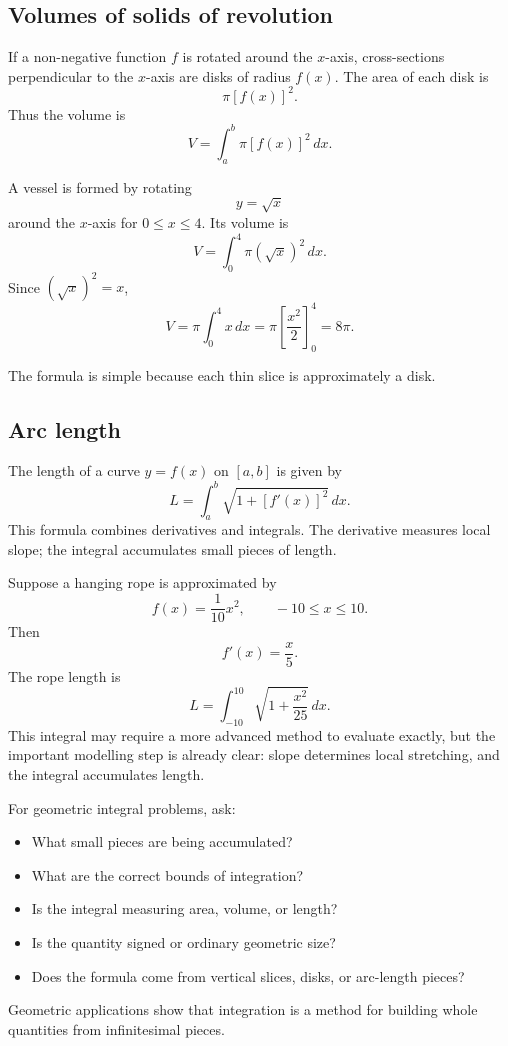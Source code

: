 \subsection*{Volumes of solids of revolution}

If a non-negative function \(f\) is rotated around the \(x\)-axis, cross-sections perpendicular to the \(x\)-axis are disks of radius \(f(x)\). The area of each disk is
\[
\pi[f(x)]^2.
\]
Thus the volume is
\[
V=\int_a^b \pi[f(x)]^2\,dx.
\]

\begin{examplebox}
A vessel is formed by rotating
\[
y=\sqrt{x}
\]
around the \(x\)-axis for \(0\le x\le4\). Its volume is
\[
V=\int_0^4 \pi(\sqrt{x})^2\,dx.
\]
Since \((\sqrt{x})^2=x\),
\[
V=\pi\int_0^4 x\,dx
=\pi\left[\frac{x^2}{2}\right]_0^4
=8\pi.
\]
\end{examplebox}

The formula is simple because each thin slice is approximately a disk.

\subsection*{Arc length}

The length of a curve \(y=f(x)\) on \([a,b]\) is given by
\[
L=\int_a^b\sqrt{1+[f'(x)]^2}\,dx.
\]
This formula combines derivatives and integrals. The derivative measures local slope; the integral accumulates small pieces of length.

\begin{examplebox}
Suppose a hanging rope is approximated by
\[
f(x)=\frac{1}{10}x^2,
\qquad -10\le x\le10.
\]
Then
\[
f'(x)=\frac{x}{5}.
\]
The rope length is
\[
L=\int_{-10}^{10}\sqrt{1+\frac{x^2}{25}}\,dx.
\]
This integral may require a more advanced method to evaluate exactly, but the important modelling step is already clear: slope determines local stretching, and the integral accumulates length.
\end{examplebox}

\begin{summarybox}
For geometric integral problems, ask:
\begin{itemize}
\item What small pieces are being accumulated?
\item What are the correct bounds of integration?
\item Is the integral measuring area, volume, or length?
\item Is the quantity signed or ordinary geometric size?
\item Does the formula come from vertical slices, disks, or arc-length pieces?
\end{itemize}
\end{summarybox}

Geometric applications show that integration is a method for building whole quantities from infinitesimal pieces.